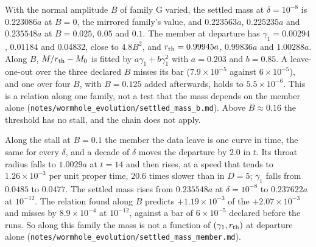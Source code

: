 \documentclass[11pt]{article}
\begin{document}
With the normal amplitude $B$ of family G varied, the settled mass at $\delta=10^{-8}$ is $0.223086a$ at $B=0$, the mirrored
family's value, and $0.223563a$, $0.225235a$ and $0.235548a$ at $B=0.025$, $0.05$ and $0.1$. The member at departure has
$\gamma_1=0.00294$, $0.01184$ and $0.04832$, close to $4.8B^2$, and $r_{\rm th}=0.99945a$, $0.99836a$ and $1.00288a$. Along $B$,
$M/r_{\rm th}-M_0$ is fitted by $a\gamma_1+b\gamma_1^2$ with $a=0.203$ and $b=0.85$. A leave-one-out over the three declared $B$ misses its bar
($7.9\times10^{-5}$ against $6\times10^{-5}$), and one over four $B$, with $B=0.125$ added afterwards, holds to $5.5\times10^{-6}$. This
is a relation along one family, not a test that the mass depends on the member alone
(\texttt{notes/wormhole\_evolution/settled\_mass\_b.md}). Above $B\approx0.16$ the threshold has no stall, and the chain does not
apply.

Along the stall at $B=0.1$ the member the data leave is one curve in time, the same for every $\delta$, and a decade of
$\delta$ moves the departure by $2.0$ in $t$. Its throat radius falls to $1.0029a$ at $t=14$ and then rises, at a speed that
tends to $1.26\times10^{-3}$ per unit proper time, $20.6$ times slower than in $D=5$; $\gamma_1$ falls from $0.0485$ to
$0.0477$. The settled mass rises from $0.235548a$ at $\delta=10^{-8}$ to $0.237622a$ at $10^{-12}$. The relation found
along $B$ predicts $+1.19\times10^{-3}$ of the $+2.07\times10^{-3}$ and misses by $8.9\times10^{-4}$ at $10^{-12}$, against
a bar of $6\times10^{-5}$ declared before the runs. So along this family the mass is not a function of $(\gamma_1,r_{\rm
th})$ at departure alone (\texttt{notes/wormhole\_evolution/settled\_mass\_member.md}).
\end{document}
